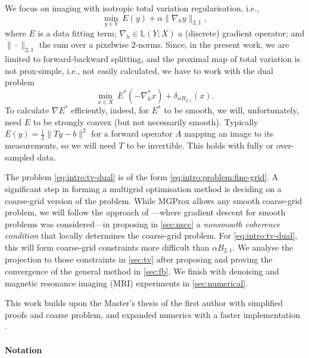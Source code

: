 \documentclass[a4paper,english]{jnsao}
\theoremstyle{definition}
\numberwithin{algorithm}{section}
\def\grad{\nabla}
\def\norm#1{\|#1\|}
\def\linear{\mathbb{L}}
\def\term#1{\emph{#1}}
\newcommand{\freevar}{\,\boldsymbol\cdot\,}
\begin{document}
We focus on imaging with isotropic total variation regularisation, i.e.,
\[
    \min_{y \in Y}~ E(y) + \alpha\norm{\grad_h y}_{2,1},
\]
where $E$ is a data fitting term; $\grad_h \in \linear(Y; X)$ a (discrete) gradient operator; and $\norm{\freevar}_{2,1}$ the sum over a pixelwise $2$-norms.
Since, in the present work, we are limited to forward-backward splitting, and the proximal map of total variation is not prox-simple, i.e., not easily calculated, we have to work with the dual problem
\begin{equation}
    \label{eq:intro:tv-dual}
    \min_{x \in X}~ E^*(-\grad_h^* x) + \delta_{\alpha B_{2,1}}(x).
\end{equation}
To calculate $\grad E^*$ efficiently, indeed, for $E^*$ to be smooth, we will, unfortunately, need $E$ to be strongly convex (but not necessarily smooth).
Typically $E(y)=\frac{1}{2}\norm{Ty-b}^2$ for a forward operator $A$ mapping an image to its measurements, so we will need $T$ to be invertible.
This holds with fully or over-sampled data.

The problem \eqref{eq:intro:tv-dual} is of the form \eqref{eq:intro:problem:fine-grid}.
A significant step in forming a multigrid optimisation method is deciding on a coarse-grid version of the problem. While MGProx \cite{ang2024mgprox} allows any smooth coarse-grid problem, we will follow the approach of \cite{parpas2017multilevel}---where gradient descent for smooth problems was considered---in proposing in \cref{sec:nscc} a \term{nonsmooth coherence condition} that locally determines the coarse-grid problem. For \cref{eq:intro:tv-dual}, this will form coarse-grid constraints more difficult than $\alpha B_{2,1}$.
We analyse the projection to those constraints in \cref{sec:tv} after proposing and proving the convergence of the general method in \cref{sec:fb}.
We finish with denoising and magnetic resonance imaging (MRI) experiments in \cref{sec:numerical}.

This work builds upon the Master's thesis of the first author \cite{felipe-msc} with simplified proofs and coarse problem, and expanded numerics with a faster implementation \cite{multigrid-codes-zenodo}.

\paragraph{Notation}
\end{document}
